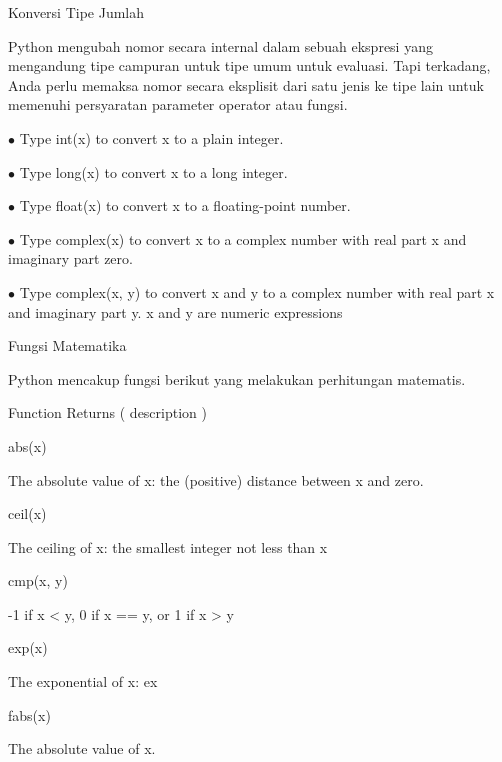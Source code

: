 Konversi Tipe Jumlah \par
\vspace{12pt}
Python mengubah nomor secara internal dalam sebuah ekspresi yang mengandung tipe campuran untuk tipe umum untuk evaluasi. Tapi terkadang, Anda perlu memaksa nomor secara eksplisit dari satu jenis ke tipe lain untuk memenuhi persyaratan parameter operator atau fungsi. \par
\vspace{12pt}
 $ \bullet $ \hspace*{0.5in} Type int(x) to convert x to a plain integer. \par
 $ \bullet $ \hspace*{0.5in} Type long(x) to convert x to a long integer. \par
 $ \bullet $ \hspace*{0.5in} Type float(x) to convert x to a floating-point number. \par
 $ \bullet $ \hspace*{0.5in} Type complex(x) to convert x to a complex number with real part x and imaginary part zero. \par
 $ \bullet $ \hspace*{0.5in} Type complex(x, y) to convert x and y to a complex number with real part x and imaginary part y. x and y are numeric expressions \par
\vspace{12pt}
Fungsi Matematika \par
\vspace{12pt}
Python mencakup fungsi berikut yang melakukan perhitungan matematis. \par
\vspace{12pt}
Function \hspace*{0.5in} Returns ( description ) \par
abs(x) \par
The absolute value of x: the (positive) distance between x and zero. \par
ceil(x)  \par
The ceiling of x: the smallest integer not less than x \par
cmp(x, y) \par
-1 if x < y, 0 if x == y, or 1 if x > y  \par
exp(x)  \par
The exponential of x: ex  \par
fabs(x) \par
The absolute value of x. \par
